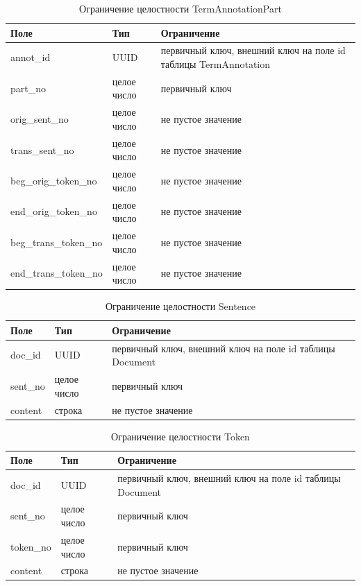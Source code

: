 \begin{table}[H]
\centering
\caption{Ограничение целостности TermAnnotationPart}
\begin{tabular}{|m{5cm}|m{3cm}|m{6cm}|}
\hline
\textbf{Поле} & \textbf{Тип} & \textbf{Ограничение} \\ \hline
annot\_id & UUID & первичный ключ, внешний ключ на поле id таблицы TermAnnotation \\ \hline
part\_no & целое число & первичный ключ \\ \hline
orig\_sent\_no & целое число & не пустое значение \\ \hline
trans\_sent\_no & целое число & не пустое значение \\ \hline
beg\_orig\_token\_no & целое число & не пустое значение \\ \hline
end\_orig\_token\_no & целое число & не пустое значение \\ \hline
beg\_trans\_token\_no & целое число & не пустое значение \\ \hline
end\_trans\_token\_no & целое число & не пустое значение \\ \hline
\end{tabular}
\label{tab:termannotparts}
\end{table}

\begin{table}[H]
\centering
\caption{Ограничение целостности Sentence}
\begin{tabular}{|m{3cm}|m{3cm}|m{6cm}|}
\hline
\textbf{Поле} & \textbf{Тип} & \textbf{Ограничение} \\ \hline
doc\_id & UUID & первичный ключ, внешний ключ на поле id таблицы Document \\ \hline
sent\_no & целое число & первичный ключ \\ \hline
content & строка & не пустое значение \\ \hline
\end{tabular}
\label{tab:sent}
\end{table}

\begin{table}[H]
\centering
\caption{Ограничение целостности Token}
\begin{tabular}{|m{3cm}|m{3cm}|m{6cm}|}
\hline
\textbf{Поле} & \textbf{Тип} & \textbf{Ограничение} \\ \hline
doc\_id & UUID & первичный ключ, внешний ключ на поле id таблицы Document \\ \hline
sent\_no & целое число & первичный ключ \\ \hline
token\_no & целое число & первичный ключ \\ \hline
content & строка & не пустое значение \\ \hline
\end{tabular}
\label{tab:token}
\end{table}

